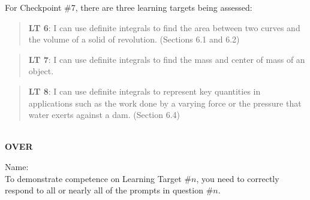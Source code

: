 \documentclass[11 pt]{article}
\begin{document}
 For Checkpoint \#7, there are three learning targets being assessed: 

\begin{quote}
{\bf LT 6}: I can use definite integrals to find the area between two curves and the volume of a solid of revolution. (Sections 6.1 and 6.2)
\end{quote}

\begin{quote}
{\bf LT 7}: I can use definite integrals to find the mass and center of mass of an object.
\end{quote}

\begin{quote}
{\bf LT 8}: I can use definite integrals to represent key quantities in applications such as the work done by a varying force or the pressure that water exerts against a dam. (Section 6.4)
\end{quote}

\noindent \hrulefill \\

\vfill \hfill {\bf OVER} 

\pagebreak

\noindent Name: \\ 

\noindent To demonstrate competence on Learning Target \#$n$, you need to correctly respond to all or nearly all of the prompts in question \#$n$.  
\end{document}
